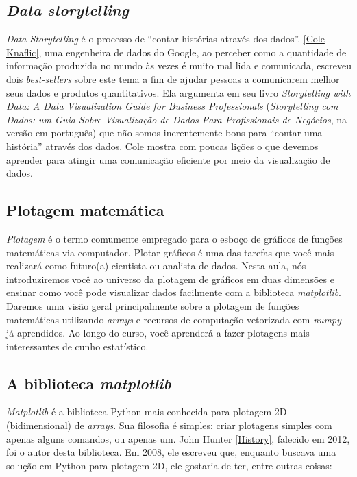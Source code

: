 \documentclass[11pt]{article}
\begin{document}
\hypertarget{data-storytelling}{%
\subsection{\texorpdfstring{\emph{Data
storytelling}}{Data storytelling}}\label{data-storytelling}}

\emph{Data Storytelling} é o processo de ``contar histórias através dos
dados''. \href{http://www.storytellingwithdata.com}{{[}Cole Knaflic{]}},
uma engenheira de dados do Google, ao perceber como a quantidade de
informação produzida no mundo às vezes é muito mal lida e comunicada,
escreveu dois \emph{best-sellers} sobre este tema a fim de ajudar
pessoas a comunicarem melhor seus dados e produtos quantitativos. Ela
argumenta em seu livro \emph{Storytelling with Data: A Data
Visualization Guide for Business Professionals} (\emph{Storytelling com
Dados: um Guia Sobre Visualização de Dados Para Profissionais de
Negócios}, na versão em português) que não somos inerentemente bons para
``contar uma história'' através dos dados. Cole mostra com poucas lições
o que devemos aprender para atingir uma comunicação eficiente por meio
da visualização de dados.

\hypertarget{plotagem-matemuxe1tica}{%
\subsection{Plotagem matemática}\label{plotagem-matemuxe1tica}}

\emph{Plotagem} é o termo comumente empregado para o esboço de gráficos
de funções matemáticas via computador. Plotar gráficos é uma das tarefas
que você mais realizará como futuro(a) cientista ou analista de dados.
Nesta aula, nós introduziremos você ao universo da plotagem de gráficos
em duas dimensões e ensinar como você pode visualizar dados facilmente
com a biblioteca \emph{matplotlib}. Daremos uma visão geral
principalmente sobre a plotagem de funções matemáticas utilizando
\emph{arrays} e recursos de computação vetorizada com \emph{numpy} já
aprendidos. Ao longo do curso, você aprenderá a fazer plotagens mais
interessantes de cunho estatístico.

\hypertarget{a-biblioteca-matplotlib}{%
\subsection{\texorpdfstring{A biblioteca
\emph{matplotlib}}{A biblioteca matplotlib}}\label{a-biblioteca-matplotlib}}

\emph{Matplotlib} é a biblioteca Python mais conhecida para plotagem 2D
(bidimensional) de \emph{arrays}. Sua filosofia é simples: criar
plotagens simples com apenas alguns comandos, ou apenas um. John Hunter
\href{https://matplotlib.org/users/history.html}{{[}History{]}},
falecido em 2012, foi o autor desta biblioteca. Em 2008, ele escreveu
que, enquanto buscava uma solução em Python para plotagem 2D, ele
gostaria de ter, entre outras coisas:
\end{document}
